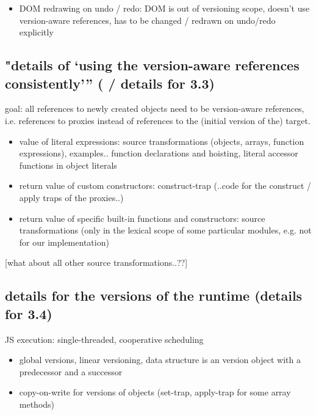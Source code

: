 \begin{itemize}
    \item DOM redrawing on undo / redo: DOM is out of versioning scope, doesn’t use version-aware references, has to be changed / redrawn on undo/redo explicitly
\end{itemize}




\subsection{"details of ‘using the version-aware references consistently’” ( / details for 3.3)}

goal: all references to newly created objects need to be version-aware references, i.e. references to proxies instead of references to the (initial version of the) target. 

\begin{itemize}
    \item value of literal expressions: source transformations (objects, arrays, function expressions), examples.. function declarations and hoisting, literal accessor functions in object literals
    \item return value of custom constructors: construct-trap (..code for the construct / apply traps of the proxies..)
    \item return value of specific built-in functions and constructors: source transformations (only in the lexical scope of some particular modules, e.g. not for our implementation)
\end{itemize}

[what about all other source transformations..??]




\subsection{details for the versions of the runtime (details for 3.4)}

JS execution: single-threaded, cooperative scheduling 

\begin{itemize}
    \item global versions, linear versioning, data structure is an version object with a predecessor and a successor
    \item copy-on-write for versions of objects (set-trap, apply-trap for some array methods)
\end{itemize}


